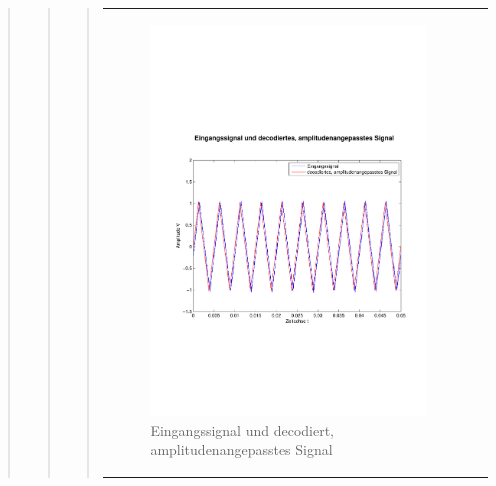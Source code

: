 \begin{quote}
\begin{quote}
\begin{quote}
\begin{center}
\begin{tabular}{ll}
                \hspace{-4cm}
                    \begin{minipage}{0.6\textwidth}
                        \begin{figure}[H]
                            \includegraphics[scale=0.4, trim = 0cm 7cm 0cm
                            7.5cm, clip]
                            {./Bilder/drei100_Eingang_vs_DecodiertAmpl-angepasst}
                              \caption{Eingangssignal und decodiert, \newline
                              amplitudenangepasstes Signal}
                        \end{figure}
                    \end{minipage}
                    

\end{tabular}
\end{center}
\end{quote}
\end{quote}
\end{quote}

